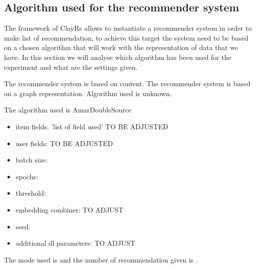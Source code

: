 \documentclass[11pt]{article}
\begin{document}
\subsection{Algorithm used for the recommender system}\label{subsec:algo}
The framework of ClayRs allows to instantiate a recommender system in order to make list of recommendation, to achieve
this target the system need to be based on a chosen algorithm that will work with the representation of data that
we have.
In this section we will analyse which algorithm has been used for the experiment and what are the settings
given.
\hfill\break
\hfill\break

The recommender system is based on content.
\hfill\break
\hfill\break
{}
The recommender system is based on a graph representation.
\hfill\break
\hfill\break
{}
Algorithm used is unknown.
\hfill\break
\hfill\break
{}

The algorithm used is AmarDoubleSource
\begin{itemize}
    \item item fields: 'list of field used' TO BE ADJUSTED
    \item user fields: TO BE ADJUSTED
    \item batch size: 
    \item epochs: 
    \item threshold: 
    \item embedding combiner: TO ADJUST
    \item seed: 
    \item additional dl parameters: TO ADJUST
\end{itemize}
\hfill\break
\hfill\break
The mode used is  and the number of recommendation given is
.
\hfill\break
\hfill\break
\end{document}
